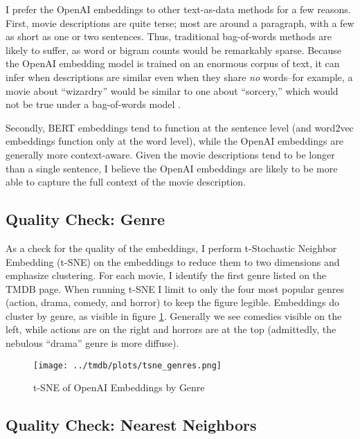 \documentclass{article}
\begin{document}
I prefer the OpenAI embeddings to other text-as-data methods for a few reasons. First, movie descriptions are quite terse; most are around a paragraph, with a few as short as one or two sentences. Thus, traditional bag-of-words methods are likely to suffer, as word or bigram counts would be remarkably sparse. Because the OpenAI embedding model is trained on an enormous corpus of text, it can infer when descriptions are similar even when they share \emph{no} words--for example, a movie about ``wizardry'' would be similar to one about ``sorcery,'' which would not be true under a bag-of-words model \parencite{brown2020a}.

Secondly, BERT embeddings tend to function at the sentence level (and word2vec embeddings function only at the word level), while the OpenAI embeddings are generally more context-aware. Given the movie descriptions tend to be longer than a single sentence, I believe the OpenAI embeddings are likely to be more able to capture the full context of the movie description.


\subsection{Quality Check: Genre}

As a check for the quality of the embeddings, I perform t-Stochastic Neighbor Embedding (t-SNE) on the embeddings to reduce them to two dimensions and emphasize clustering. For each movie, I identify the first genre listed on the TMDB page. When running t-SNE I limit to only the four most popular genres (action, drama, comedy, and horror) to keep the figure legible. Embeddings do cluster by genre, as visible in figure \ref{fig:tsne}. Generally we see comedies visible on the left, while actions are on the right and horrors are at the top (admittedly, the nebulous ``drama'' genre is more diffuse).

\begin{figure}
    \texttt{[image: ../tmdb/plots/tsne\_genres.png]}
    \caption{t-SNE of OpenAI Embeddings by Genre}
    \label{fig:tsne}
\end{figure}


\subsection{Quality Check: Nearest Neighbors}
\end{document}

